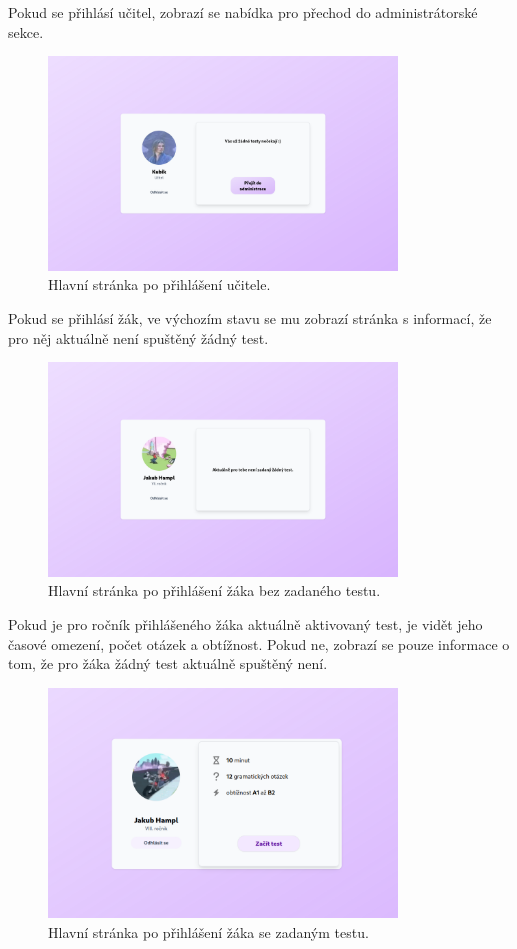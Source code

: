 \newpage

Pokud se přihlásí učitel, zobrazí se nabídka pro přechod do administrátorské sekce.

\begin{figure}[H]
    \centering
    \includegraphics[width=350px]{images/01design/teacher.png}
    \caption{Hlavní stránka po přihlášení učitele.}
\end{figure}

Pokud se přihlásí žák, ve výchozím stavu se mu zobrazí stránka s informací, že pro něj aktuálně není spuštěný žádný test.

\begin{figure}[H]
    \centering
    \includegraphics[width=350px]{images/01design/student-no-test.png}
    \caption{Hlavní stránka po přihlášení žáka bez zadaného testu.}
\end{figure}

Pokud je pro ročník přihlášeného žáka aktuálně aktivovaný test, je vidět jeho časové omezení, počet otázek a obtížnost. Pokud ne, zobrazí se pouze informace o tom, že pro žáka žádný test aktuálně spuštěný není.

\begin{figure}[H]
    \centering
    \includegraphics[width=350px]{images/01design/student-yes-test.png}
    \caption{Hlavní stránka po přihlášení žáka se zadaným testu.}
\end{figure}

